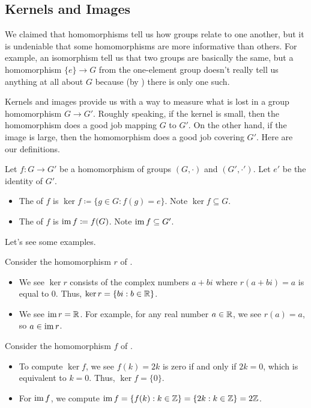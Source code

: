 \documentclass[../notes.tex]{subfiles}
\begin{document}
\subsection{Kernels and Images}
We claimed that homomorphisms tell us how groups relate to one another, but it is undeniable that some homomorphisms are more informative than others. For example, an isomorphism tell us that two groups are basically the same, but a homomorphism $\{e\}\to G$ from the one-element group doesn't really tell us anything at all about $G$ because (by ) there is only one such.

Kernels and images provide us with a way to measure what is lost in a group homomorphism $G\to G'$. Roughly speaking, if the kernel is small, then the homomorphism does a good job mapping $G$ to $G'$. On the other hand, if the image is large, then the homomorphism does a good job covering $G'$. Here are our definitions.
\begin{definition}
    Let $f\colon G\to G'$ be a homomorphism of groups $(G,\cdot)$ and $(G',\cdot')$. Let $e'$ be the identity of $G'$.
    \begin{itemize}
        \item The  of $f$ is $\ker f\coloneqq\{g\in G:f(g)=e\}$. Note $\ker f\subseteq G$.
        \item The  of $f$ is $\operatorname{im} f\coloneqq f(G)$. Note $\operatorname{im} f\subseteq G'$.
    \end{itemize}
\end{definition}
Let's see some examples.
\begin{example} \label{ex:real-part-ker-im}
    Consider the homomorphism $r$ of .
    \begin{itemize}
        \item We see $\ker r$ consists of the complex numbers $a+bi$ where $r(a+bi)=a$ is equal to $0$. Thus, $\ker r=\{bi:b\in\mathbb R\}$.
        \item We see $\operatorname{im} r=\mathbb R$. For example, for any real number $a\in\mathbb R$, we see $r(a)=a$, so $a\in\operatorname{im} r$.
    \end{itemize}
\end{example}
\begin{example}
    Consider the homomorphism $f$ of .
    \begin{itemize}
        \item To compute $\ker f$, we see $f(k)=2k$ is zero if and only if $2k=0$, which is equivalent to $k=0$. Thus, $\ker f=\{0\}$.
        \item For $\operatorname{im} f$, we compute $\operatorname{im} f=\{f(k):k\in\mathbb Z\}=\{2k:k\in\mathbb Z\}=2\mathbb Z$.
    \end{itemize}
\end{example}
\end{document}
